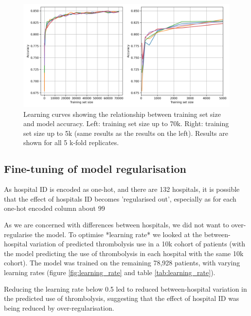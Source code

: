 \begin{figure}
\centering
\includegraphics[width=1\textwidth]{./images/02_xgb_10_features_learning_curve}
\caption{Learning curves showing the relationship between training set size and model accuracy. Left: training set size up to 70k. Right: training set size up to 5k (same results as the results on the left). Results are shown for all 5 k-fold replicates.}
\label{fig:learning_curve}
\end{figure}


\subsection{Fine-tuning of model regularisation}
\label{sec:fine_tune}

As hospital ID is encoded as one-hot, and there are 132 hospitals, it is possible that the effect of hospitals ID becomes 'regularised out', especially as for each one-hot encoded column about 99%

As we are concerned with differences between hospitals, we did not want to over-regularise the model. To optimise *learning rate* we looked at the between-hospital variation of predicted thrombolysis use in a 10k cohort of patients (with the model predicting the use of thrombolysis in each hospital with the same 10k cohort). The model was trained on the remaining 78,928 patients, with varying learning rates (figure \ref{fig:learning_rate} and table \ref{tab:learning_rate}).

Reducing the learning rate below 0.5 led to reduced between-hospital variation in the predicted use of thrombolysis, suggesting that the effect of hospital ID was being reduced by over-regularisation. 

